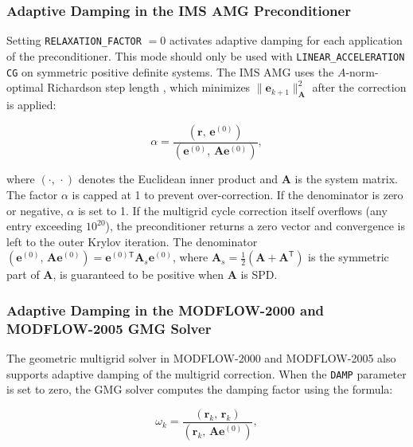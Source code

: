 \subsubsection{Adaptive Damping in the IMS AMG Preconditioner}

Setting \texttt{RELAXATION\_FACTOR} $= 0$ activates adaptive damping for each application of the preconditioner. This mode should only be used with \texttt{LINEAR\_ACCELERATION CG} on symmetric positive definite systems. The IMS AMG uses the $A$-norm-optimal Richardson step length \citep{saad2003iterative}, which minimizes $\|\mathbf{e}_{k+1}\|_{\mathbf{A}}^2$ after the correction is applied:

\begin{equation}
  \label{eqn:amgadaptive}
  \alpha = \frac{\left( \mathbf{r},\, \mathbf{e}^{(0)} \right)}
                {\left( \mathbf{e}^{(0)},\, \mathbf{A} \mathbf{e}^{(0)} \right)} ,
\end{equation}

\noindent where $\left( \cdot,\, \cdot \right)$ denotes the Euclidean inner product and $\mathbf{A}$ is the system matrix. The factor $\alpha$ is capped at 1 to prevent over-correction. If the denominator is zero or negative, $\alpha$ is set to 1. If the multigrid cycle correction itself overflows (any entry exceeding $10^{20}$), the preconditioner returns a zero vector and convergence is left to the outer Krylov iteration. The denominator $\left(\mathbf{e}^{(0)},\, \mathbf{A}\mathbf{e}^{(0)}\right) = \mathbf{e}^{(0)\mathsf{T}} \mathbf{A}_s \mathbf{e}^{(0)}$, where $\mathbf{A}_s = \tfrac{1}{2}(\mathbf{A} + \mathbf{A}^{\mathsf{T}})$ is the symmetric part of $\mathbf{A}$, is guaranteed to be positive when $\mathbf{A}$ is SPD.


\subsubsection{Adaptive Damping in the MODFLOW-2000 and MODFLOW-2005 GMG Solver}

The geometric multigrid solver in MODFLOW-2000 and MODFLOW-2005 \citep{wilsonnaff2004} also supports adaptive damping of the multigrid correction. When the \texttt{DAMP} parameter is set to zero, the GMG solver computes the damping factor using the formula:

\begin{equation}
  \label{eqn:gmgadaptive}
  \omega_k = \frac{\left( \mathbf{r}_k,\, \mathbf{r}_k \right)}
                  {\left( \mathbf{r}_k,\, \mathbf{A} \mathbf{e}^{(0)} \right)} ,
\end{equation}

